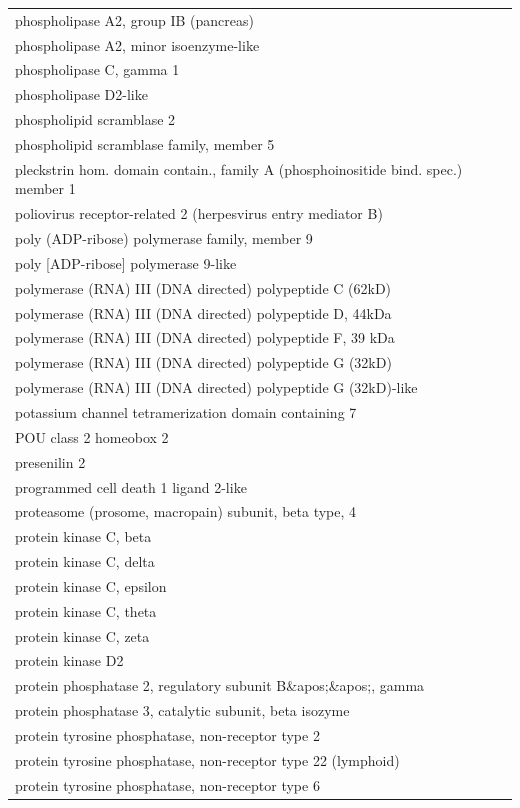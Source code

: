 \documentclass[english]{article}\usepackage[]{graphicx}\usepackage[]{color}
\begin{document}
\begin{longtable}{l}
phospholipase A2, group IB (pancreas) \\ 
phospholipase A2, minor isoenzyme-like \\ 
phospholipase C, gamma 1 \\ 
phospholipase D2-like \\ 
phospholipid scramblase 2 \\ 
phospholipid scramblase family, member 5 \\ 
pleckstrin hom. domain contain., family A (phosphoinositide bind. spec.) member 1 \\ 
poliovirus receptor-related 2 (herpesvirus entry mediator B) \\ 
poly (ADP-ribose) polymerase family, member 9 \\ 
poly [ADP-ribose] polymerase 9-like \\ 
polymerase (RNA) III (DNA directed) polypeptide C (62kD) \\ 
polymerase (RNA) III (DNA directed) polypeptide D, 44kDa \\ 
polymerase (RNA) III (DNA directed) polypeptide F, 39 kDa \\ 
polymerase (RNA) III (DNA directed) polypeptide G (32kD) \\ 
polymerase (RNA) III (DNA directed) polypeptide G (32kD)-like \\ 
potassium channel tetramerization domain containing 7 \\ 
POU class 2 homeobox 2 \\ 
presenilin 2 \\ 
programmed cell death 1 ligand 2-like \\ 
proteasome (prosome, macropain) subunit, beta type, 4 \\ 
protein kinase C, beta \\ 
protein kinase C, delta \\ 
protein kinase C, epsilon \\ 
protein kinase C, theta \\ 
protein kinase C, zeta \\ 
protein kinase D2 \\ 
protein phosphatase 2, regulatory subunit B\&apos;\&apos;, gamma \\ 
protein phosphatase 3, catalytic subunit, beta isozyme \\ 
protein tyrosine phosphatase, non-receptor type 2 \\ 
protein tyrosine phosphatase, non-receptor type 22 (lymphoid) \\ 
protein tyrosine phosphatase, non-receptor type 6 \\ 

\end{longtable}
\end{document}
